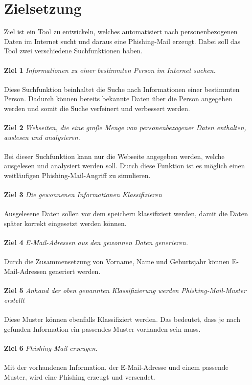 \section{Zielsetzung}
\label {sec:Zielsetzung}
 Ziel ist ein Tool zu entwickeln, welches automatisiert nach personenbezogenen Daten im Internet sucht und daraus eine Phishing-Mail erzeugt. Dabei soll das Tool zwei verschiedene Suchfunktionen haben. \\\\
 {\bf Ziel 1} \textit{Informationen zu einer bestimmten Person im Internet suchen.}\\\\
 Diese Suchfunktion beinhaltet die Suche nach Informationen einer bestimmten Person. Dadurch können bereits bekannte Daten über die Person angegeben werden und somit die Suche verfeinert und verbessert werden.\\\\
 {\bf Ziel 2} \textit{Webseiten, die eine große Menge von personenbezogener Daten enthalten, auslesen und analysieren.}\\\\
 Bei dieser Suchfunktion kann nur die Webseite angegeben werden, welche ausgelesen und analysiert werden soll. Durch diese Funktion ist es möglich einen weitläufigen Phishing-Mail-Angriff zu simulieren.\\\\
 {\bf Ziel 3} \textit{Die gewonnenen Informationen Klassifizieren}\\\\
 Ausgelesene Daten sollen vor dem speichern klassifiziert werden, damit die Daten später korrekt eingesetzt werden können.\\\\
 {\bf Ziel 4} \textit{E-Mail-Adressen aus den gewonnen Daten generieren.}\\\\
 Durch die Zusammensetzung von Vorname, Name und Geburtsjahr können E-Mail-Adressen generiert werden.\\\\
 {\bf Ziel 5} \textit{Anhand der oben genannten Klassifizierung werden Phishing-Mail-Muster erstellt}\\\\
 Diese Muster können ebenfalls Klassifiziert werden. Das bedeutet, dass je nach gefunden Information ein passendes Muster vorhanden sein muss.\\\\
 {\bf Ziel 6} \textit{Phishing-Mail erzeugen.}\\\\
 Mit der vorhandenen Information, der E-Mail-Adresse und einem passende Muster, wird eine Phishing erzeugt und versendet.
 
